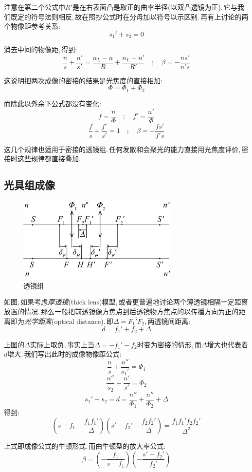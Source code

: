 注意在第二个公式中\(R'\)是在右表面凸是取正的曲率半径(以双凸透镜为正),\,它与我们既定的符号法则相反,\,故在照抄公式时在分母加以符号以示区别.\,再有上讨论的两个物像距参考关系:
\[s_1'+s_2=0\]

消去中间的物像距,\,得到:
\[\frac{n}{s}+\frac{n'}{s'}=\frac{n_L-n}{R}+\frac{n_L-n'}{R'}\quad ;\quad \beta=-\frac{ns'}{n's}\]

这说明把两次成像的密接的结果是光焦度的直接相加:
\[\varPhi=\varPhi_1+\varPhi_2\]

而除此以外余下公式都没有变化:
\[f=\frac{n}{\varPhi}\quad;\quad f'=\frac{n'}{\varPhi}\]
\[\frac{f}{s}+\frac{f'}{s'}=1\quad;\quad \beta=-\frac{fs'}{f's}\]

这几个规律也适用于密接的透镜组.\,任何发散和会聚光的能力直接用光焦度评价,\,密接时这些规律都直接叠加.

\subsection{光具组成像}
\begin{figure}
\centering
\vspace{0cm}
\includegraphics[width=8cm]{image/5-7-6.png}
\caption{透镜组}
\end{figure}
如图,\,如果考虑\emph{厚透镜}(thick lens)模型,\,或者更普遍地讨论两个薄透镜相隔一定距离放置的情况.\,那么一般把前透镜像方焦点到后透镜物方焦点的以传播方向为正的距离即为\emph{光学距离}(optical distance).\,即\(\varDelta=\overline{F_1' F_2}\),\,两透镜间距离:
\[d=f_1'+f_2+\Delta\]

上图的\(\varDelta\)实际上取负,\,事实上当\(\varDelta=-f_1'-f_2\)时变为密接的情形,\,而\(\varDelta\)增大也代表着\(d\)增大.\,我们写出此时的成像物像距公式:
\[\frac{n}{s}+\frac{n''}{s_1'}=\varPhi_1\]
\[\frac{n''}{s_2}+\frac{n'}{s'}=\varPhi_2\]
\[s_1'+s_2=d=\frac{n''}{\varPhi_1}+\frac{n''}{\varPhi_2}+\varDelta\]
得到:
\[(s-f_1-\frac{f_1f_1'}{\varDelta})(s'-f_2'-\frac{f_2f_2'}{\varDelta})=\frac{f_1f_1'f_2f_2'}{\varDelta^2}\]

上式即成像公式的牛顿形式.\,而由牛顿型的放大率公式:
\[\beta=(-\frac{f_1}{s-f_1})(-\frac{s'-f_2'}{f_2'})\]

